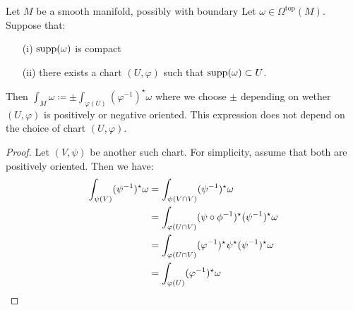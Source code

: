 \begin{lemma}\label{lem:11.7}
    Let \(M\) be a smooth manifold, possibly with boundary Let \(\omega\in \Omega^{\text{top}}(M)\). Suppose that:
    \begin{enumerate}
        \item[(i)] \(\text{supp}(\omega)\) is compact 
        \item[(ii)] there exists a chart \((U,\varphi)\) such that \(\text{supp}(\omega)\subset U\).  
    \end{enumerate}
    Then \(\int_M\omega\coloneqq \pm \int_{\varphi(U)}(\varphi^{-1})^\star \omega\)
    where we choose \(\pm\) depending on wether \((U,\varphi)\) is positively or negative oriented.
    This expression does not depend on the choice of chart \((U,\varphi)\).
\end{lemma}
\begin{proof}
    Let \((V,\psi)\) be another such chart. For simplicity, assume that 
    both are positively oriented. Then we have: 
    \begin{align*}
        \int_{\psi(V)}(\psi^{-1})^\star \omega&=\int_{\psi(V\cap V)}(\psi^{-1})^\star \omega\\
        &=\int_{\varphi(U\cap V)} (\psi\circ\phi^{-1})^\star (\psi^{-1})^\star\omega\\
        &=\int_{\varphi(U\cap V)}(\varphi^{-1})^\star \psi^\star(\psi^{-1})^\star \omega\\
        &=\int_{\varphi(U)}(\varphi^{-1})^\star \omega \qedhere
    \end{align*}
\end{proof}

